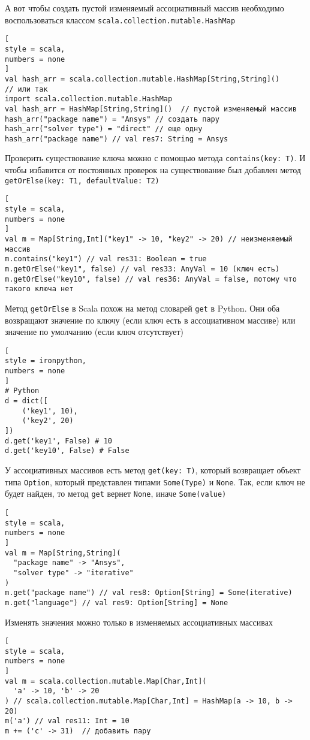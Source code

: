 \documentclass[%
	11pt,
	a4paper,
	utf8,
		]{article}
\begin{document}
А вот чтобы создать пустой изменяемый ассоциативный массив необходимо воспользоваться классом \texttt{scala.collection.mutable.HashMap}
\begin{lstlisting}[
style = scala,
numbers = none
]
val hash_arr = scala.collection.mutable.HashMap[String,String]()
// или так
import scala.collection.mutable.HashMap
val hash_arr = HashMap[String,String]()  // пустой изменяемый массив
hash_arr("package name") = "Ansys" // создать пару
hash_arr("solver type") = "direct" // еще одну
hash_arr("package name") // val res7: String = Ansys
\end{lstlisting}

Проверить существование ключа можно с помощью метода \texttt{contains(key: T)}. И чтобы избавится от постоянных проверок на существование был добавлен метод \texttt{getOrElse(key: T1, defaultValue: T2)}
\begin{lstlisting}[
style = scala,
numbers = none
]
val m = Map[String,Int]("key1" -> 10, "key2" -> 20) // неизменяемый массив
m.contains("key1") // val res31: Boolean = true
m.getOrElse("key1", false) // val res33: AnyVal = 10 (ключ есть)
m.getOrElse("key10", false) // val res36: AnyVal = false, потому что такого ключа нет
\end{lstlisting}

Метод \texttt{getOrElse} в Scala похож на метод словарей \texttt{get} в Python. Они оба возвращают значение по ключу (если ключ есть в ассоциативном массиве) или значение по умолчанию (если ключ отсутствует)
\begin{lstlisting}[
style = ironpython,
numbers = none
]
# Python
d = dict([
    ('key1', 10),
    ('key2', 20)
])
d.get('key1', False) # 10
d.get('key10', False) # False
\end{lstlisting}

У ассоциативных массивов есть метод \texttt{get(key: T)}, который возвращает объект типа \texttt{Option}, который представлен типами \texttt{Some(Type)} и \texttt{None}. Так, если ключ не будет найден, то метод \texttt{get} вернет \texttt{None}, иначе \texttt{Some(value)}
\begin{lstlisting}[
style = scala,
numbers = none
]
val m = Map[String,String](
  "package name" -> "Ansys",
  "solver type" -> "iterative"
)
m.get("package name") // val res8: Option[String] = Some(iterative)
m.get("language") // val res9: Option[String] = None
\end{lstlisting}

Изменять значения можно только в изменяемых ассоциативных массивах
\begin{lstlisting}[
style = scala,
numbers = none
]
val m = scala.collection.mutable.Map[Char,Int](
  'a' -> 10, 'b' -> 20
) // scala.collection.mutable.Map[Char,Int] = HashMap(a -> 10, b -> 20)
m('a') // val res11: Int = 10
m += ('c' -> 31)  // добавить пару
\end{lstlisting}
\end{document}
